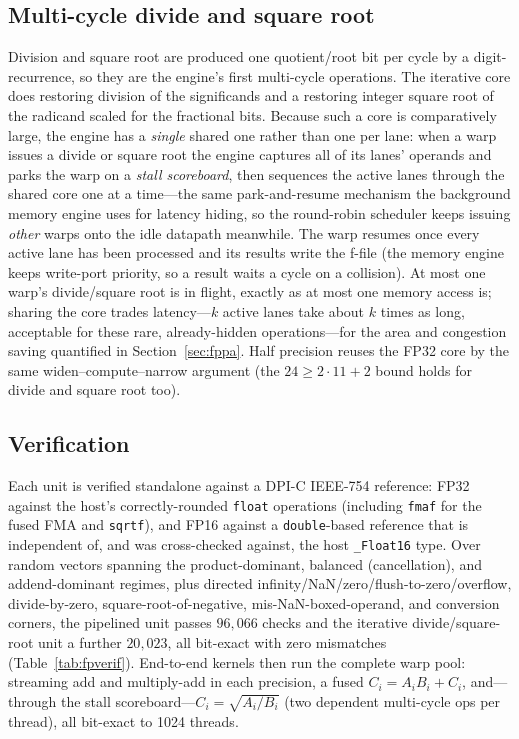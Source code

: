 \documentclass[conference]{IEEEtran}
\begin{document}
\subsection{Multi-cycle divide and square root}\label{sec:fpsfu}
Division and square root are produced one quotient/root bit per cycle by a
digit-recurrence, so they are the engine's first multi-cycle operations. The
iterative core does restoring division of the significands and a restoring integer
square root of the radicand scaled for the fractional bits. Because such a core is
comparatively large, the engine has a \emph{single} shared one rather than one per
lane: when a warp issues a divide or square root the engine captures all of its
lanes' operands and parks the warp on a \emph{stall scoreboard}, then sequences the
active lanes through the shared core one at a time---the same park-and-resume
mechanism the background memory engine uses for latency hiding, so the round-robin
scheduler keeps issuing \emph{other} warps onto the idle datapath meanwhile. The
warp resumes once every active lane has been processed and its results write the
f-file (the memory engine keeps write-port priority, so a result waits a cycle on a
collision). At most one warp's divide/square root is in flight, exactly as at most
one memory access is; sharing the core trades latency---$k$ active lanes take about
$k$ times as long, acceptable for these rare, already-hidden operations---for the
area and congestion saving quantified in Section~\ref{sec:fppa}. Half precision
reuses the FP32 core by the same widen--compute--narrow argument (the
$24\ge2\cdot11+2$ bound holds for divide and square root too).

\subsection{Verification}
Each unit is verified standalone against a DPI-C IEEE-754 reference: FP32 against
the host's correctly-rounded \texttt{float} operations (including \texttt{fmaf}
for the fused FMA and \texttt{sqrtf}), and FP16 against a \texttt{double}-based
reference that is independent of, and was cross-checked against, the host
\texttt{\_Float16} type. Over random vectors spanning the product-dominant,
balanced (cancellation), and addend-dominant regimes, plus directed
infinity/NaN/zero/flush-to-zero/overflow, divide-by-zero, square-root-of-negative,
mis-NaN-boxed-operand, and conversion corners, the pipelined unit passes
$96{,}066$ checks and the iterative divide/square-root unit a further $20{,}023$,
all bit-exact with zero mismatches (Table~\ref{tab:fpverif}). End-to-end kernels
then run the complete warp pool: streaming add and multiply-add in each precision,
a fused $C_i=A_iB_i+C_i$, and---through the stall scoreboard---$C_i=\sqrt{A_i/B_i}$
(two dependent multi-cycle ops per thread), all bit-exact to 1024 threads.
\end{document}
